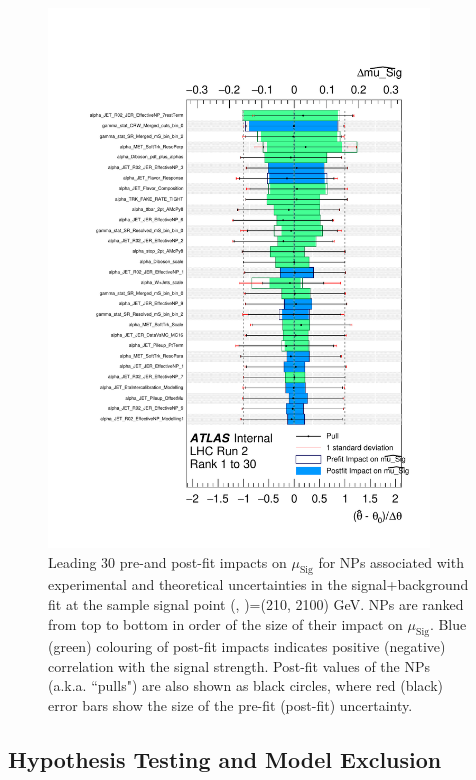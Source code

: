 \begin{figure}[h]
  \centering
  \includegraphics[width=0.9\textwidth]{Figures/8/ranking_mu_Sig_rank_0001_to_0030_zp2100_dm200_dh210_unblinded.pdf}
  \caption[Pre- and post-fit impacts for unblinded CRs (\ms, \mZp)=(210, 2100) GeV]{Leading 30 pre-and post-fit impacts on \(\mu_\text{Sig}\) for NPs associated with experimental and theoretical uncertainties in the signal+background fit at the sample signal point (\ms, \mZp)=(210, 2100) GeV. NPs are ranked from top to bottom in order of the size of their impact on \(\mu_\text{Sig}\). Blue (green) colouring of post-fit impacts indicates positive (negative) correlation with the signal strength. Post-fit values of the NPs (a.k.a. ``pulls") are also shown as black circles, where red (black) error bars show the size of the pre-fit (post-fit) uncertainty.}
  \label{fig:ranking_ms210}
\end{figure}

\subsection{Hypothesis Testing and Model Exclusion}

